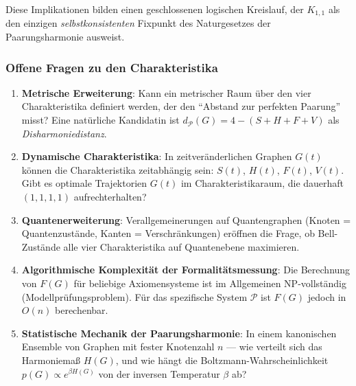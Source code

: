 ﻿\documentclass[a4paper,12pt]{article}
\theoremstyle{definition}
\begin{document}
Diese Implikationen bilden einen geschlossenen logischen Kreislauf, der $K_{1,1}$
als den einzigen \emph{selbstkonsistenten} Fixpunkt des Naturgesetzes der Paarungsharmonie
ausweist.

\subsubsection*{Offene Fragen zu den Charakteristika}

\begin{enumerate}
	\item \textbf{Metrische Erweiterung}: Kann ein metrischer Raum über den vier
	Charakteristika definiert werden, der den \enquote{Abstand zur perfekten Paarung}
	misst? Eine natürliche Kandidatin ist $d_{\mathcal{P}}(G) = 4 - (S + H + F + V)$
	als \emph{Disharmoniedistanz}.
	
	\item \textbf{Dynamische Charakteristika}: In zeitveränderlichen Graphen $G(t)$
	können die Charakteristika zeitabhängig sein: $S(t)$, $H(t)$, $F(t)$, $V(t)$.
	Gibt es optimale Trajektorien $G(t)$ im Charakteristikaraum, die dauerhaft
	$(1,1,1,1)$ aufrechterhalten?
	
	\item \textbf{Quantenerweiterung}: Verallgemeinerungen auf Quantengraphen
	(Knoten = Quantenzustände, Kanten = Verschränkungen) eröffnen die Frage, ob
	Bell-Zustände alle vier Charakteristika auf Quantenebene maximieren.
	
	\item \textbf{Algorithmische Komplexität der Formalitätsmessung}: Die Berechnung
	von $F(G)$ für beliebige Axiomensysteme ist im Allgemeinen NP-vollständig
	(Modellprüfungsproblem). Für das spezifische System $\mathcal{P}$ ist $F(G)$
	jedoch in $O(n)$ berechenbar.
	
	\item \textbf{Statistische Mechanik der Paarungsharmonie}: In einem kanonischen
	Ensemble von Graphen mit fester Knotenzahl $n$ --- wie verteilt sich das
	Harmoniemaß $H(G)$, und wie hängt die Boltzmann-Wahrscheinlichkeit
	$p(G) \propto e^{\beta H(G)}$ von der inversen Temperatur $\beta$ ab?
\end{enumerate}
\end{document}
